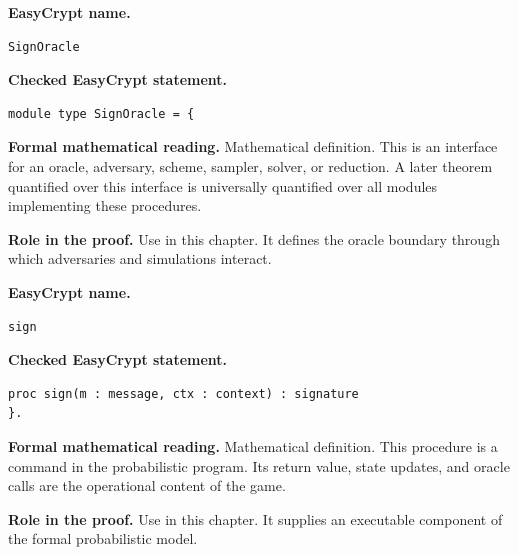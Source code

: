 \begin{formaldefinition}
\noindent\textbf{EasyCrypt name.}
\begin{lstlisting}[language=EasyCrypt,basicstyle=\ttfamily\scriptsize]
SignOracle
\end{lstlisting}
\noindent\textbf{Checked EasyCrypt statement.}
\begin{lstlisting}[language=EasyCrypt,basicstyle=\ttfamily\scriptsize]
module type SignOracle = {
\end{lstlisting}
\noindent\textbf{Formal mathematical reading.}
Mathematical definition. This is an interface for an oracle, adversary, scheme, sampler, solver, or reduction.  A later theorem quantified over this interface is universally quantified over all modules implementing these procedures.

\noindent\textbf{Role in the proof.}
Use in this chapter. It defines the oracle boundary through which adversaries and simulations interact.

\end{formaldefinition}

\begin{formaldefinition}
\noindent\textbf{EasyCrypt name.}
\begin{lstlisting}[language=EasyCrypt,basicstyle=\ttfamily\scriptsize]
sign
\end{lstlisting}
\noindent\textbf{Checked EasyCrypt statement.}
\begin{lstlisting}[language=EasyCrypt,basicstyle=\ttfamily\scriptsize]
proc sign(m : message, ctx : context) : signature
}.
\end{lstlisting}
\noindent\textbf{Formal mathematical reading.}
Mathematical definition. This procedure is a command in the probabilistic program.  Its return value, state updates, and oracle calls are the operational content of the game.

\noindent\textbf{Role in the proof.}
Use in this chapter. It supplies an executable component of the formal probabilistic model.

\end{formaldefinition}

